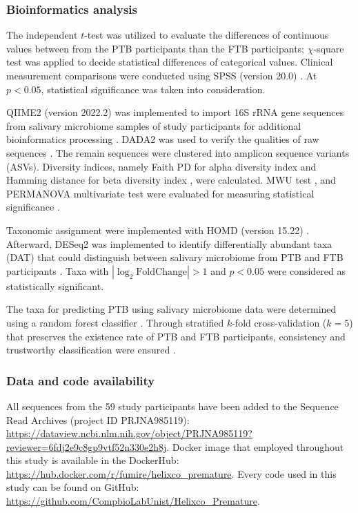 \documentclass[11pt, a4paper, onecolumn, oneside]{report}
\begin{document}
            \subsubsection{Bioinformatics analysis}
                The independent $t$-test was utilized to evaluate the differences of continuous values between from the PTB participants than the FTB participants; $\chi$-square test was applied to decide statistical differences of categorical values. Clinical measurement comparisons were conducted using SPSS (version 20.0) \cite{SPSS-1}. At $p < 0.05$, statistical significance was taken into consideration.

                QIIME2 (version 2022.2) was implemented to import 16S rRNA gene sequences from salivary microbiome samples of study participants for additional bioinformatics processing \cite{QIIME2-1}. DADA2 was used to verify the qualities of raw sequences \cite{DADA2-1}. The remain sequences were clustered into amplicon sequence variants (ASVs). Diversity indices, namely Faith PD for alpha diversity index \cite{FaithPD-1} and Hamming distance for beta diversity index \cite{Hamming-1}, were calculated. MWU test \cite{MWW-1}, and PERMANOVA multivariate test were evaluated for measuring statistical significance \cite{PERMANOVA-1, PERMANOVA-2}.

                Taxonomic assignment were implemented with HOMD (version 15.22) \cite{HOMD-1}. Afterward, DESeq2 was implemented to identify differentially abundant taxa (DAT) that could distinguish between salivary microbiome from PTB and FTB participants \cite{DESeq2-1}. Taxa with $| \log _2 \textrm{FoldChange} | > 1$ and $p < 0.05$ were considered as statistically significant.

                The taxa for predicting PTB using salivary microbiome data were determined using a random forest classifier \cite{RF-1}. Through stratified $k$-fold cross-validation ($k=5$) that preserves the existence rate of PTB and FTB participants, consistency and trustworthy classification were ensured \cite{Kfold-1}.

            \subsubsection{Data and code availability}
                All sequences from the 59 study participants have been added to the Sequence Read Archives (project ID PRJNA985119): \url{https://dataview.ncbi.nlm.nih.gov/object/PRJNA985119?reviewer=6fdj2e9c8gp9vtf52n330e2h8j}. Docker image that employed throughout this study is available in the DockerHub: \url{https://hub.docker.com/r/fumire/helixco_premature}. Every code used in this study can be found on GitHub: \url{https://github.com/CompbioLabUnist/Helixco_Premature}.
        \newpage
\end{document}
